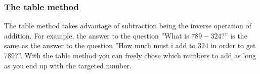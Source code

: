 \subsubsection{The table method}
The table method takes advantage of subtraction being the inverse operation of addition. For example, the answer to the question ''What is $ 789-324 $?'' is the same as the answer to the question ''How much must i add to 324 in order to get 789?''. With the table method you can freely chose which numbers to add as long as you end up with the targeted number.\\
\begin{center}
\parbox{0.35\linewidth}{
} \qquad
\parbox{0.35\linewidth}{
	} \\[12pt]
\parbox{0.35\linewidth}{
	} \qquad 
\parbox{0.4\linewidth}{
	}
\end{center}
